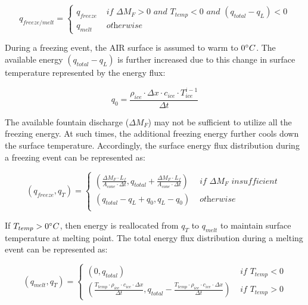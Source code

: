 \documentclass[utf8]{frontiersSCNS}
\begin{document}
\begin{equation}
	q_{freeze/melt} = \left\{ \begin{array}{ll}
		q_{freeze} & \textit{ if } \Delta M_{F} > 0 \textit{ and } T_{temp} < 0 \textit{ and }(q_{total}-q_{L}) < 0 \\
		q_{melt}   & \textit{ otherwise}
	\end{array} \right.
\end{equation}

During a freezing event, the AIR surface is assumed to warm to $0 \degree C$. The available energy
$(q_{total}-q_{L})$ is further increased due to this change in surface temperature represented by the energy
flux:

$$q_{0} = \frac{\rho_{ice} \cdot \Delta x \cdot c_{ice} \cdot T_{ice}^{i-1}}{\Delta t}$$

The available fountain discharge ($\Delta M_{F}$) may not be sufficient to utilize all the freezing energy. At such times, 
the additional freezing energy further cools down the surface temperature. Accordingly, the surface energy flux
distribution during a freezing event can be represented as:

\begin{equation}
	(q_{freeze}, q_{T}) = \left\{ \begin{array}{ll}
		(\frac{\Delta M_{F} \cdot L_f
		}{A_{cone} \cdot \Delta t}
		, q_{total}+\frac{\Delta M_{F} \cdot L_f
		}{A_{cone} \cdot \Delta t})          & \textit{ if  } \Delta M_{F} \textit{ insufficient }\\
		(q_{total}-q_{L}+q_{0}, q_{L}-q_{0}) & \textit{ otherwise }                                                                      \\
	\end{array} \right.
\end{equation}

If $T_{temp} > 0 \degree C$, then energy is reallocated from $q_{T}$ to $q_{melt}$ to maintain surface
temperature at melting point. The total energy flux distribution during a melting event can be represented as:

\begin{equation}
	(q_{melt}, q_{T}) = \left\{ \begin{array}{ll}
		(0, q_{total})                                                                                                                                                 & \textit{ if } T_{temp} < 0 \\
		(\frac{T_{temp} \cdot \rho_{ice} \cdot c_{ice} \cdot \Delta x}{\Delta t}, q_{total}-\frac{T_{temp} \cdot \rho_{ice} \cdot c_{ice} \cdot \Delta x}{\Delta t}  ) & \textit{ if } T_{temp} > 0
	\end{array} \right.
\end{equation}
\end{document}
